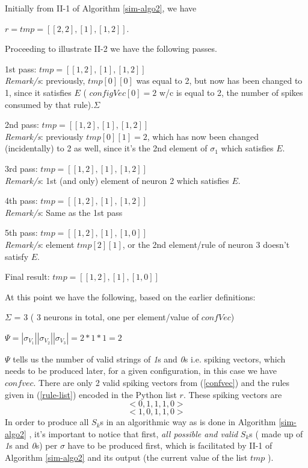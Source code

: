 \documentclass{svmultm}
\begin{document}
Initially from II-1 of Algorithm \ref{sim-algo2}, we have

$r = tmp = [ [ 2, 2 ], [ 1 ], [ 1, 2 ] ]$.

Proceeding to illustrate II-2 we have the following passes.

1st pass:
$tmp = [ [ 1, 2 ], [ 1 ], [ 1, 2 ] ]$\\
\textit{Remark/s}: previously, $tmp [ 0 ][ 0 ]$ was equal to 2,
but now has been changed to 1, since it satisfies $E$
( $configVec[ 0 ] = 2$ w/c is equal to 2, the
number of spikes consumed by that rule).$\Sigma$

2nd pass:
$tmp = [ [ 1, 2 ], [ 1 ], [ 1, 2 ] ]$\\
\textit{Remark/s}: previously $tmp[ 0 ][ 1 ] = 2$, which has
now been changed (incidentally) to 2 as well, since
it's the 2nd element of $\sigma_1$ which satisfies $E$.

3rd pass:
$tmp = [ [ 1, 2 ], [ 1 ], [ 1, 2 ] ]$\\
\textit{Remark/s}: 1st (and only) element of neuron 2 which
satisfies $E$.

4th pass:
$tmp = [ [ 1, 2 ], [ 1 ], [ 1, 2 ] ]$\\
\textit{Remark/s}: Same as the 1st pass

5th pass:
$tmp = [ [ 1, 2 ], [ 1 ], [ 1, 0 ] ]$\\
\textit{Remark/s}: element $tmp[ 2 ][ 1 ]$, or the 2nd
element/rule of neuron 3 doesn't satisfy $E$.

Final result:
$tmp = [ [ 1, 2 ], [ 1 ], [ 1, 0 ] ]$

At this point we have the following, based on the
earlier definitions:

$\Sigma$ = 3 ( 3 neurons in total, one per element/value of
$confVec$)

$\Psi = |\sigma_{V_1}| |\sigma_{V_2}| |\sigma_{V_3}| = 2 * 1 * 1 = 2$

$\Psi$ tells us the number of valid strings of \textit{1}s and \textit{0}s i.e.
spiking vectors, which needs to be produced later, for a
given configuration, in this case we have $confvec$. There are only
2 valid spiking vectors from (\ref{confvec}) and the
rules given in (\ref{rule-list}) encoded in the Python list $r$. These spiking vectors are
\begin{equation}\label{sk-211-1}
< 0, 1, 1, 1, 0>
\end{equation}
\begin{equation}\label{sk-211-2}
< 1, 0, 1, 1, 0>
\end{equation}
In order to produce all $S_k$s in an algorithmic way as is done in Algorithm \ref{sim-algo2} , it's
important to notice that first, \textit{all possible and valid} $S_k$s ( made up of \textit{1}s and \textit{0}s) per $\sigma$ have to be
produced first, which is facilitated by II-1 of Algorithm \ref{sim-algo2} and its output (the
current value of the list $tmp$ ).
\end{document}
